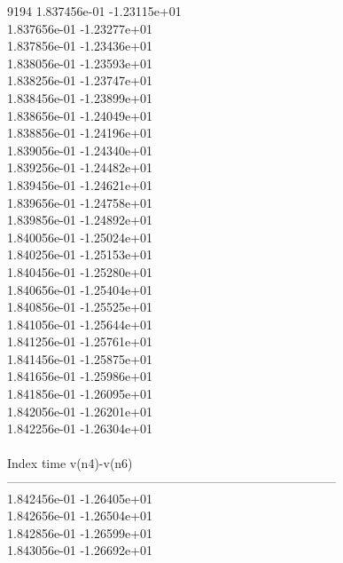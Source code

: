 9194	1.837456e-01	-1.23115e+01	\\ 	1.837656e-01	-1.23277e+01	\\ 	1.837856e-01	-1.23436e+01	\\ 	1.838056e-01	-1.23593e+01	\\ 	1.838256e-01	-1.23747e+01	\\ 	1.838456e-01	-1.23899e+01	\\ 	1.838656e-01	-1.24049e+01	\\ 	1.838856e-01	-1.24196e+01	\\ 	1.839056e-01	-1.24340e+01	\\ 	1.839256e-01	-1.24482e+01	\\ 	1.839456e-01	-1.24621e+01	\\ 	1.839656e-01	-1.24758e+01	\\ 	1.839856e-01	-1.24892e+01	\\ 	1.840056e-01	-1.25024e+01	\\ 	1.840256e-01	-1.25153e+01	\\ 	1.840456e-01	-1.25280e+01	\\ 	1.840656e-01	-1.25404e+01	\\ 	1.840856e-01	-1.25525e+01	\\ 	1.841056e-01	-1.25644e+01	\\ 	1.841256e-01	-1.25761e+01	\\ 	1.841456e-01	-1.25875e+01	\\ 	1.841656e-01	-1.25986e+01	\\ 	1.841856e-01	-1.26095e+01	\\ 	1.842056e-01	-1.26201e+01	\\ 	1.842256e-01	-1.26304e+01	\\ \hline
\\ \hline
Index   time            v(n4)-v(n6)     \\ \hline
--------------------------------------------------------------------------------\\ 	1.842456e-01	-1.26405e+01	\\ 	1.842656e-01	-1.26504e+01	\\ 	1.842856e-01	-1.26599e+01	\\ 	1.843056e-01	-1.26692e+01	\\ \hline
